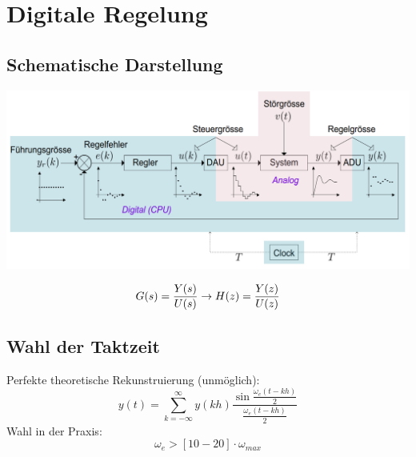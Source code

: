 



\chapter{Digitale Regelung}

\section{Schematische Darstellung}
\begin{center}
	\includegraphics[scale = 0.3]{images/schematische_darstellung.png}
\end{center}
\[
	G(s)=\frac{Y(s)}{U(s)}\\ \rightarrow \\ H(z)=\frac{Y(z)}{U(z)} \\ \\
\]

\section{Wahl der Taktzeit}
Perfekte theoretische Rekunstruierung (unmöglich):
\[
	y(t) = \sum_{k=-\infty}^{\infty} y(kh) \frac{\sin\frac{\omega_e(t-kh)}{2}}{\frac{\omega_e(t-kh)}{2}}
\]
Wahl in der Praxis:
\[
	\omega_e > [10-20]\cdot \omega_{max}
\]

